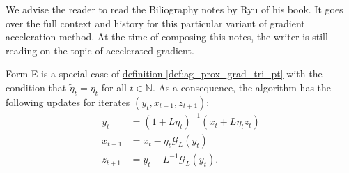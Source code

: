 \documentclass[12pt]{article}
\begin{document}
            \begin{remark}
                We advise the reader to read the Biliography notes by Ryu \cite[chapter 12]{ryu_large-scale_2022} of his book. 
                It goes over the full context and history for this particular variant of gradient acceleration method. 
                At the time of composing this notes, the writer is still reading on the topic of accelerated gradient.     
            \end{remark}

            \begin{definition}
            \label{def:ag_tri_pt_form_E}
                Form E is a special case of 
                \hyperref[def:ag_prox_grad_tri_pt]{definition \ref*{def:ag_prox_grad_tri_pt}}
                with the condition that $\tilde \eta_t = \eta_t$ for all $t \in \mathbb N$. 
                As a consequence, the algorithm has the following updates for iterates $(y_t, x_{t + 1}, z_{t + 1})$: 
                \begin{align*}
                    y_t &= (1 + L\eta_t)^{-1}(x_t + L\eta_t z_t)
                    \\
                    x_{t + 1} &= x_t - \eta_t \mathcal G_L(y_t)
                    \\
                    z_{t + 1} &= y_t - L^{-1}\mathcal G_L(y_t).
                \end{align*}
            \end{definition}
\end{document}
